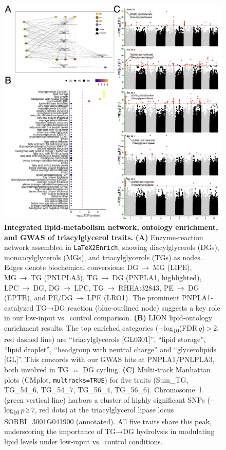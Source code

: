 \documentclass[10pt,letterpaper]{article}
\begin{document}
\begin{figure}[htbp]
  \centering
  \includegraphics[width=\textwidth]{fig/main/Fig6.png}
  \caption{\textbf{Integrated lipid‐metabolism network, ontology enrichment, and GWAS of triacylglycerol traits.}
    \textbf{(A)} Enzyme‐reaction network assembled in \texttt{LaTeX2Enrich}, showing diacylglycerols (DGs), monoacylglycerols (MGs), and triacylglycerols (TGs) as nodes.  Edges denote biochemical conversions: DG → MG (LIPE), MG → TG (PNLPLA3), TG → DG (PNPLA1, highlighted), LPC → DG, DG → LPC, TG → RHEA:32843, PE → DG (EPTB), and PE/DG → LPE (LRO1).  The prominent PNPLA1‐catalyzed TG→DG reaction (blue‐outlined node) suggests a key role in our low‑input vs.\ control comparison.
    \textbf{(B)} LION lipid‐ontology enrichment results.  The top enriched categories (−log\textsubscript{10}(FDR $q$) > 2, red dashed line) are “triacylglycerols [GL0301]”, “lipid storage”, “lipid droplet”, “headgroup with neutral charge” and “glycerolipids [GL]”.  This concords with our GWAS hits at PNPLA1/PNLPLA3, both involved in TG ↔ DG cycling.
    \textbf{(C)} Multi‑track Manhattan plots (CMplot, \texttt{multracks=TRUE}) for five traits (Sum\_TG, TG\_54\_6, TG\_54\_7, TG\_56\_4, TG\_56\_6).  Chromosome 1 (green vertical line) harbors a cluster of highly significant SNPs (–log\textsubscript{10} $p$ ≥ 7, red dots) at the triacylglycerol lipase locus SORBI\_3001G041900 (annotated).  All five traits share this peak, underscoring the importance of TG→DG hydrolysis in modulating lipid levels under low‑input vs.\ control conditions.}
  \label{fig:Fig6}
\end{figure}
\end{document}
